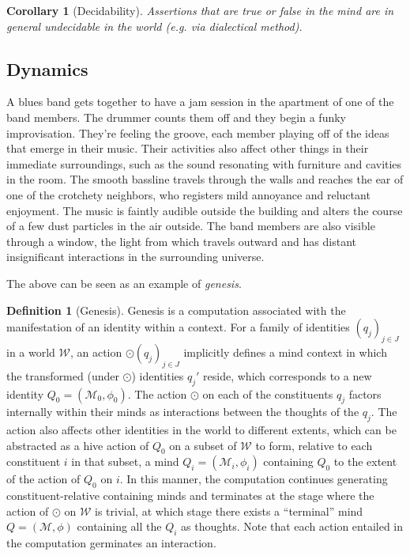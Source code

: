 \documentclass[pra,twocolumn,groupedaddress,10pt]{revtex4}
\newtheorem{corollary}[theorem]{Corollary}
\theoremstyle{definition}
\newtheorem{defn}{Definition}[section]
\begin{document}
\begin{corollary}[Decidability] \label{cor:decidability}
	Assertions that are true or false in the mind are in general undecidable in the world (e.g. via dialectical method).
\end{corollary}

\subsection{Dynamics} \label{sec:dynamics}

A blues band gets together to have a jam session in the apartment of one of the band members. The drummer counts them off and they begin a funky improvisation. They're feeling the groove, each member playing off of the ideas that emerge in their music. Their activities also affect other things in their immediate surroundings, such as the sound resonating with furniture and cavities in the room. The smooth bassline travels through the walls and reaches the ear of one of the crotchety neighbors, who registers mild annoyance and reluctant enjoyment. The music is faintly audible outside the building and alters the course of a few dust particles in the air outside. The band members are also visible through a window, the light from which travels outward and has distant insignificant interactions in the surrounding universe.

The above can be seen as an example of \emph{genesis}.

\begin{defn}[Genesis]
	Genesis is a computation associated with the manifestation of an identity within a context. For a family of identities $(q_{j})_{j \in J}$ in a world $\mathcal{W}$, an action $\odot (q_{j})_{j \in J}$ implicitly defines a mind context in which the transformed (under $\odot$) identities $q_{j}'$ reside, which corresponds to a new identity $Q_{0} = (\mathcal{M}_{0}, \phi_{0})$. The action $\odot$ on each of the constituents $q_{j}$ factors internally within their minds as interactions between the thoughts of the $q_{j}$. The action also affects other identities in the world to different extents, which can be abstracted as a hive action of $Q_{0}$ on a subset of $\mathcal{W}$ to form, relative to each constituent $i$ in that subset, a mind $Q_{i} = (\mathcal{M}_{i}, \phi_{i})$ containing $Q_{0}$ to the extent of the action of $Q_{0}$ on $i$. In this manner, the computation continues generating constituent-relative containing minds and terminates at the stage where the action of $\odot$ on $\mathcal{W}$ is trivial, at which stage there exists a ``terminal'' mind $Q = (\mathcal{M}, \phi)$ containing all the $Q_{i}$ as thoughts. Note that each action entailed in the computation germinates an interaction.
\end{defn}
\end{document}
